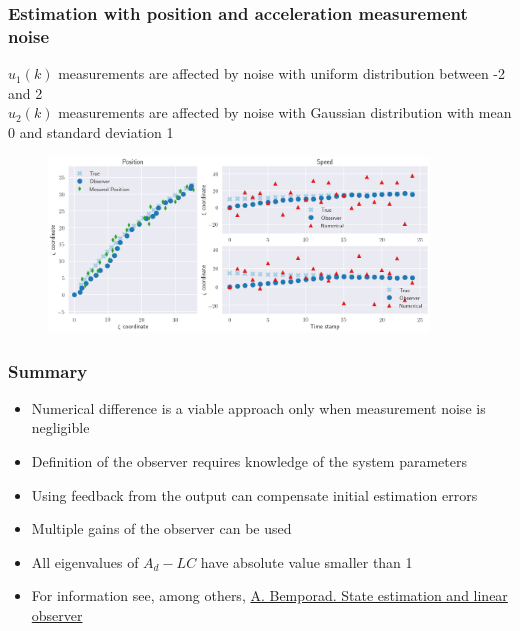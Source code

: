 \begin{frame}
	\frametitle{Estimation with position and acceleration measurement noise}
	$u_1(k)$ measurements are affected by noise with uniform distribution between -2 and 2\\
	$u_2(k)$ measurements are affected by noise with Gaussian distribution with mean 0 and standard deviation 1
	\begin{figure}
		\includegraphics[width=0.9\textwidth]{fig/observer_ex_3}
	\end{figure}
\end{frame}

\begin{frame}
	\frametitle{Summary}
	\begin{itemize}
		\setlength\itemsep{1.5em}
		\item Numerical difference is a viable approach only when measurement noise is negligible
		\item Definition of the observer requires knowledge of the system parameters
		\item Using feedback from the output can compensate initial estimation errors
		\item Multiple gains of the observer can be used
		\item All eigenvalues of $A_d-LC$ have absolute value smaller than 1
		\item For information see, among others, \href{http://cse.lab.imtlucca.it/~bemporad/teaching/ac/pdf/06b-estimator.pdf}{A. Bemporad. State estimation and linear observer}
	\end{itemize}

\end{frame}
